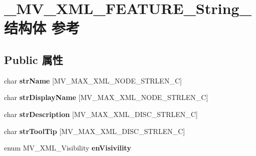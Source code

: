 \hypertarget{struct___m_v___x_m_l___f_e_a_t_u_r_e___string__}{}\section{\+\_\+\+M\+V\+\_\+\+X\+M\+L\+\_\+\+F\+E\+A\+T\+U\+R\+E\+\_\+\+String\+\_\+结构体 参考}
\label{struct___m_v___x_m_l___f_e_a_t_u_r_e___string__}
\subsection*{Public 属性}
\begin{DoxyCompactItemize}
\item 
\mbox{\label{struct___m_v___x_m_l___f_e_a_t_u_r_e___string___a71344251a4fa83a92fed401189f91f46}} 
char {\bfseries str\+Name} \mbox{[}M\+V\+\_\+\+M\+A\+X\+\_\+\+X\+M\+L\+\_\+\+N\+O\+D\+E\+\_\+\+S\+T\+R\+L\+E\+N\+\_\+C\mbox{]}
\item 
\mbox{\label{struct___m_v___x_m_l___f_e_a_t_u_r_e___string___a75604727e187138a618d3c39da75ee8d}} 
char {\bfseries str\+Display\+Name} \mbox{[}M\+V\+\_\+\+M\+A\+X\+\_\+\+X\+M\+L\+\_\+\+N\+O\+D\+E\+\_\+\+S\+T\+R\+L\+E\+N\+\_\+C\mbox{]}
\item 
\mbox{\label{struct___m_v___x_m_l___f_e_a_t_u_r_e___string___a2bfb68e4c8f0bcef7c419dd48e98d796}} 
char {\bfseries str\+Description} \mbox{[}M\+V\+\_\+\+M\+A\+X\+\_\+\+X\+M\+L\+\_\+\+D\+I\+S\+C\+\_\+\+S\+T\+R\+L\+E\+N\+\_\+C\mbox{]}
\item 
\mbox{\label{struct___m_v___x_m_l___f_e_a_t_u_r_e___string___a8fc3a87127e1673ef5165238a36401d7}} 
char {\bfseries str\+Tool\+Tip} \mbox{[}M\+V\+\_\+\+M\+A\+X\+\_\+\+X\+M\+L\+\_\+\+D\+I\+S\+C\+\_\+\+S\+T\+R\+L\+E\+N\+\_\+C\mbox{]}
\item 
\mbox{\label{struct___m_v___x_m_l___f_e_a_t_u_r_e___string___a65f02b06fa8170b2791f61dd2d75f4c9}} 
enum M\+V\+\_\+\+X\+M\+L\+\_\+\+Visibility {\bfseries en\+Visivility}
\item 

\end{DoxyCompactItemize}
